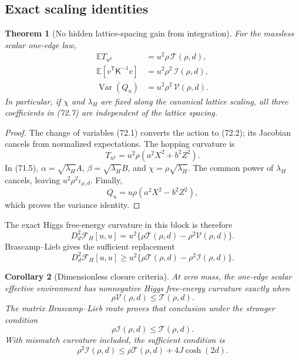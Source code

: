 \documentclass[11pt]{article}
\newtheorem{theorem}{Theorem}[section]
\newtheorem{corollary}[theorem]{Corollary}
\theoremstyle{remark}
\begin{document}
\subsection{Exact scaling identities}

\begin{theorem}[No hidden lattice-spacing gain from integration]
\label{thm:v17v72-scaling}
For the massless scalar one-edge law,
\[
\boxed{
\begin{aligned}
 \mathbb E T_{u^2}
 &=u^2\rho\,\mathcal T(\rho,d),\\
 \mathbb E[v^{\mathsf T}\mathsf K^{-1}v]
 &=u^2\rho^2\,\mathcal I(\rho,d),\\
 \operatorname{Var}(Q_u)
 &=u^2\rho^2\,\mathcal V(\rho,d).
\end{aligned}}                                    \tag{72.7}
\]
In particular, if \(\chi\) and \(\lambda_H\) are fixed along the
canonical lattice scaling, all three coefficients in (72.7) are
independent of the lattice spacing.
\end{theorem}

\begin{proof}
The change of variables (72.1) converts the action to (72.2); its
Jacobian cancels from normalized expectations.  The hopping curvature
is
\[
 T_{u^2}=u^2\rho(a^2X^2+b^2Z^2).                 \tag{72.8}
\]
In (71.5), \(\alpha=\sqrt{\lambda_H}A\),
\(\beta=\sqrt{\lambda_H}B\), and
\(\chi=\rho\sqrt{\lambda_H}\).  The common power of
\(\lambda_H\) cancels, leaving
\(u^2\rho^2\iota_{\rho,d}\).  Finally,
\[
 Q_u=u\rho(a^2X^2-b^2Z^2),                       \tag{72.9}
\]
which proves the variance identity.
\end{proof}

The exact Higgs free-energy curvature in this block is therefore
\[
 D_d^2\mathcal F_H[u,u]
 =u^2\{\rho\mathcal T(\rho,d)
       -\rho^2\mathcal V(\rho,d)\}.              \tag{72.10}
\]
Brascamp--Lieb gives the sufficient replacement
\[
 D_d^2\mathcal F_H[u,u]
 \geq u^2\{\rho\mathcal T(\rho,d)
       -\rho^2\mathcal I(\rho,d)\}.              \tag{72.11}
\]

\begin{corollary}[Dimensionless closure criteria]
\label{cor:v17v72-criteria}
At zero mass, the one-edge scalar effective environment has
nonnegative Higgs free-energy curvature exactly when
\[
 \rho\mathcal V(\rho,d)\leq\mathcal T(\rho,d).   \tag{72.12}
\]
The matrix Brascamp--Lieb route proves that conclusion under the
stronger condition
\[
 \rho\mathcal I(\rho,d)\leq\mathcal T(\rho,d).   \tag{72.13}
\]
With mismatch curvature included, the sufficient condition is
\[
 \rho^2\mathcal I(\rho,d)
 \leq\rho\mathcal T(\rho,d)+4J\cosh(2d).         \tag{72.14}
\]
\end{corollary}
\end{document}
